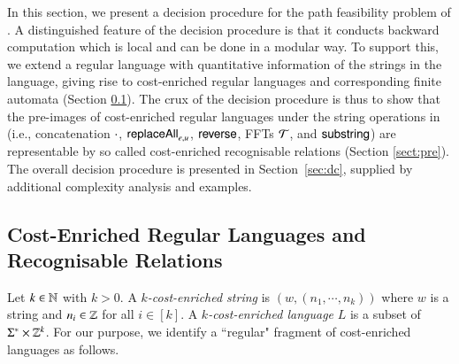 
In this section, we present a decision procedure for the path feasibility problem of {\slint}. A distinguished feature of the decision procedure is that it conducts backward computation which is local and can be done in a modular way. To support this, we extend  a regular language with quantitative information of the strings in the language, giving rise to cost-enriched regular languages and corresponding finite automata (Section \ref{sect:ce}). The crux of the decision procedure is thus to show that the  pre-images of cost-enriched regular languages under the string operations in {\slint} (i.e., concatenation $\cdot$, $\mathsf{replaceAll}_{e,u}$, $\mathsf{reverse}$, FFTs $\mathcal{T}$, and $\mathsf{substring}$) are representable by so called cost-enriched recognisable relations (Section \ref{sect:pre}). The overall decision procedure is presented in Section~\ref{sec:dc}, supplied by additional complexity analysis and examples. 

\subsection{Cost-Enriched Regular Languages and Recognisable Relations} \label{sect:ce}

Let $k \in \mathbb{N}$ with $k > 0$. A \emph{$k$-cost-enriched string} is $(w, (n_1, \cdots, n_k))$ where $w$ is a string and $n_i \in \mathbb{Z}$ for all $i \in [k]$. A \emph{$k$-cost-enriched language} $L$ is a subset of $\Sigma^* \times \mathbb{Z}^k$. For our purpose, we identify a ``regular" fragment of cost-enriched languages as follows.  

